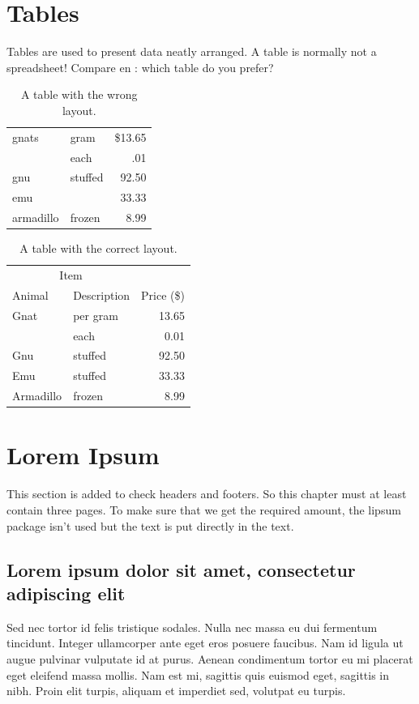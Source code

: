 \section{Tables}
Tables are used to present data neatly arranged. A table is normally
not a spreadsheet! Compare  en : which table do
you prefer?

\begin{table}
  \centering
  \begin{tabular}{||l|lr||} \hline
    gnats     & gram      & \$13.65 \\ \cline{2-3}
              & each      & .01 \\ \hline
    gnu       & stuffed   & 92.50 \\ \cline{1-1} \cline{3-3}
    emu       &           & 33.33 \\ \hline
    armadillo & frozen    & 8.99 \\ \hline
  \end{tabular}
  \caption{A table with the wrong layout.}
  \label{tab:wrong}
\end{table}

\begin{table}
  \centering
  \begin{tabular}{@{}llr@{}} \toprule
    \multicolumn{2}{c}{Item} \\ \cmidrule(r){1-2}
    Animal    & Description & Price (\$)\\ \midrule
    Gnat      & per gram    & 13.65 \\
              & each        & 0.01 \\
    Gnu       & stuffed     & 92.50 \\
    Emu       & stuffed     & 33.33 \\
    Armadillo & frozen      & 8.99 \\ \bottomrule
  \end{tabular}
  \caption{A table with the correct layout.}
  \label{tab:ok}
\end{table}

\section{Lorem Ipsum}
This section is added to check headers and footers. So this chapter must at
least contain three pages. To make sure that we get the required amount,
the \textsf{lipsum} package isn't used but the text is put directly in the
text.

\subsection{Lorem ipsum dolor sit amet, consectetur adipiscing elit}
Sed nec tortor id felis tristique sodales. Nulla nec massa eu dui fermentum
tincidunt. Integer ullamcorper ante eget eros posuere faucibus. Nam id
ligula ut augue pulvinar vulputate id at purus. Aenean condimentum tortor
eu mi placerat eget eleifend massa mollis. Nam est mi, sagittis quis
euismod eget, sagittis in nibh. Proin elit turpis, aliquam et imperdiet
sed, volutpat eu turpis.

